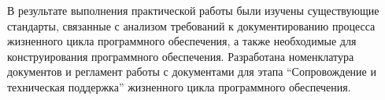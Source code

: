 
\pagebreak
{}

В результате выполнения практической работы были изучены существующие стандарты, связанные с анализом
требований к документированию процесса жизненного цикла программного обеспечения, а также необходимые
для конструирования программного обеспечения.
Разработана номенклатура документов и регламент работы с документами для этапа
\enquote{Сопровождение и техническая поддержка} жизненного цикла программного обеспечения.